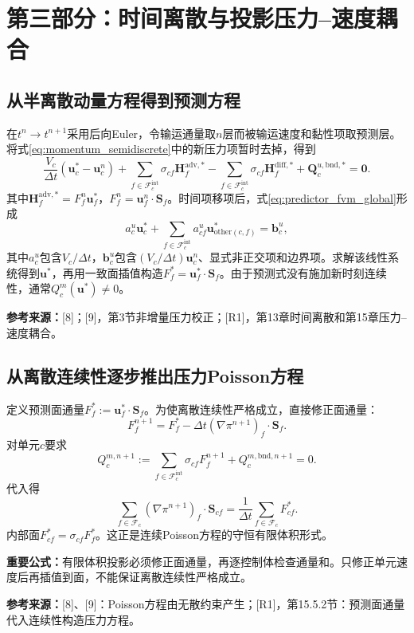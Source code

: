 \documentclass[UTF8,12pt,a4paper]{ctexart}
\numberwithin{equation}{section}
\newcommand{\dt}{\Delta t}
\newcommand{\Chorin}{\textnormal{[8]}}
\newcommand{\Guermond}{\textnormal{[9]}}
\newcommand{\Rone}{\textnormal{[R1]}}
\newcommand{\source}[1]{\par\smallskip\noindent\colorbox{sourcebg}{%
  \parbox{0.955\linewidth}{\footnotesize\color{sourcegray}\textbf{参考来源：}#1}}\par\smallskip}
\newcommand{\keytitle}[1]{\par\smallskip\noindent\colorbox{keybg}{%
  \parbox{0.965\linewidth}{\color{keyblue}\textbf{重要公式：}#1}}\par\smallskip}
\begin{document}
\section{第三部分：时间离散与投影压力--速度耦合}
\subsection{从半离散动量方程得到预测方程}
在$t^n\to t^{n+1}$采用后向Euler，令输运通量取$n$层而被输运速度和黏性项取预测层。将式\eqref{eq:momentum_semidiscrete}中的新压力项暂时去掉，得到
\begin{equation}
  \boxed{\frac{V_c}{\dt}(\bm u_c^*-\bm u_c^n)
  +\sum_{f\in\mathcal F_c^{\mathrm{int}}}\sigma_{cf}\bm H_f^{\mathrm{adv},*}
  -\sum_{f\in\mathcal F_c^{\mathrm{int}}}\sigma_{cf}\bm H_f^{\mathrm{diff},*}
  +\bm Q_c^{u,\mathrm{bnd},*}=\bm0.}
  \label{eq:predictor_fvm_global}
\end{equation}
其中$\bm H_f^{\mathrm{adv},*}=F_f^n\bm u_f^*$，$F_f^n=\bm u_f^n\cdot\bm S_f$。时间项移项后，式\eqref{eq:predictor_fvm_global}形成
\begin{equation}
  \boxed{a_c^u\bm u_c^*+
  \sum_{f\in\mathcal F_c^{\mathrm{int}}}a_{cf}^u
  \bm u_{\mathrm{other}(c,f)}^*=\bm b_c^u,}
  \label{eq:projection_predictor_matrix}
\end{equation}
其中$a_c^u$包含$V_c/\dt$，$\bm b_c^u$包含$(V_c/\dt)\bm u_c^n$、显式非正交项和边界项。求解该线性系统得到$\bm u^*$，再用一致面插值构造$F_f^*=\bm u_f^*\cdot\bm S_f$。由于预测式没有施加新时刻连续性，通常$Q_c^m(\bm u^*)\ne0$。
\source{\Chorin；\Guermond，第3节非增量压力校正；\Rone，第13章时间离散和第15章压力--速度耦合。}

\subsection{从离散连续性逐步推出压力Poisson方程}
定义预测面通量$F_f^*:=\bm u_f^*\cdot\bm S_f$。为使离散连续性严格成立，直接修正面通量：
\begin{equation}
  \boxed{F_f^{n+1}
  =F_f^*-\dt(\nabla\pi^{n+1})_f\cdot\bm S_f.}
  \label{eq:flux_correction}
\end{equation}
对单元$c$要求
\begin{equation}
  Q_c^{m,n+1}:=
  \sum_{f\in\mathcal F_c^{\mathrm{int}}}\sigma_{cf}F_f^{n+1}
  +Q_c^{m,\mathrm{bnd},n+1}=0.
  \label{eq:discrete_continuity}
\end{equation}
代入得
\begin{equation}
  \boxed{\sum_{f\in\mathcal F_c}
  (\nabla\pi^{n+1})_f\cdot\bm S_{cf}
  =\frac{1}{\dt}\sum_{f\in\mathcal F_c}F_{cf}^*.}
  \label{eq:pressure_fvm}
\end{equation}
内部面$F_{cf}^*=\sigma_{cf}F_f^*$。这正是连续Poisson方程的守恒有限体积形式。
\keytitle{有限体积投影必须修正面通量，再逐控制体检查通量和。只修正单元速度后再插值到面，不能保证离散连续性严格成立。}
\source{\Chorin、\Guermond：Poisson方程由无散约束产生；\Rone，第15.5.2节：预测面通量代入连续性构造压力方程。}
\end{document}
